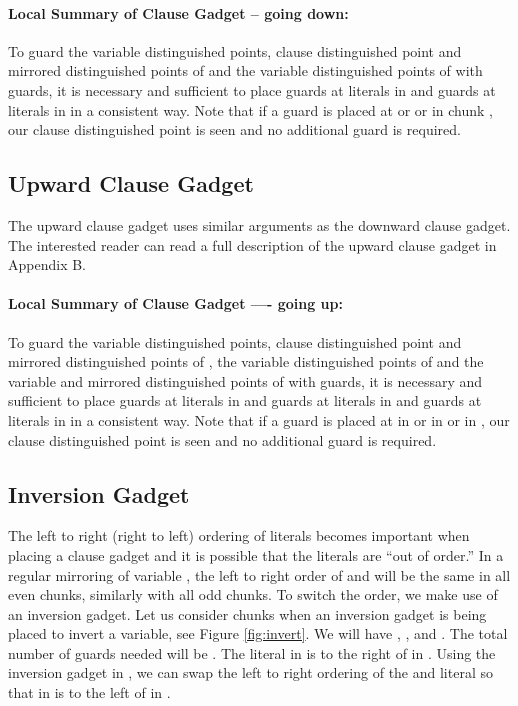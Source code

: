 \documentclass[11pt]{article}
\begin{document}
\paragraph{Local Summary of Clause Gadget -- going down:}  To guard the variable distinguished points, clause distinguished point and mirrored distinguished points of  and the variable distinguished points of  with  guards, it is necessary and sufficient to place  guards at literals in  and  guards at literals in  in a consistent way.  Note that if a guard is placed at  or  or  in chunk , our clause distinguished point is seen and no additional guard is required.



\subsection{Upward Clause Gadget}

The upward clause gadget uses similar arguments as the downward clause gadget.  The interested reader can read a full description of the upward clause gadget in Appendix B. 

\paragraph{Local Summary of Clause Gadget ---- going up:}  To guard the variable distinguished points, clause distinguished point and mirrored distinguished points of , the variable distinguished points of  and the variable and mirrored distinguished points of  with  guards, it is necessary and sufficient to place  guards at literals in  and  guards at literals in  and  guards at literals in  in a consistent way.  Note that if a guard is placed at  in  or  in  or  in , our clause distinguished point is seen and no additional guard is required.



\subsection{Inversion Gadget}

The left to right (right to left) ordering of literals becomes important when placing a clause gadget and it is possible that the literals are ``out of order.''  In a regular mirroring of variable , the left to right order of  and  will be the same in all even chunks, similarly with all odd chunks.  To switch the order, we make use of an inversion gadget.  Let us consider chunks  when an inversion gadget is being placed to invert a variable, see Figure \ref{fig:invert}.  We will have , ,  and .  The total number of guards needed will be .  The  literal in  is to the right of  in .  Using the inversion gadget in , we can swap the left to right ordering of the  and  literal so that  in  is to the left of  in .
\end{document}
